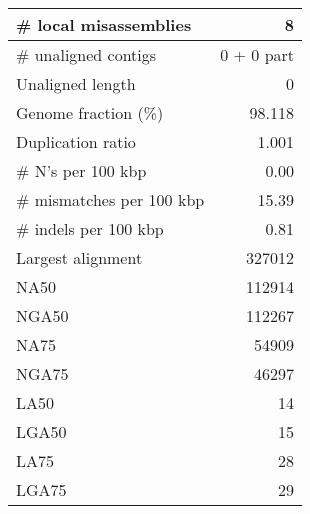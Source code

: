 \documentclass[12pt,a4paper]{article}
\begin{document}
\begin{table}[ht]
\begin{center}
\begin{tabular}{|l*{1}{|r}|}
\# local misassemblies & 8 \\ \hline
\# unaligned contigs & 0 + 0 part \\ \hline
Unaligned length & 0 \\ \hline
Genome fraction (\%) & 98.118 \\ \hline
Duplication ratio & 1.001 \\ \hline
\# N's per 100 kbp & 0.00 \\ \hline
\# mismatches per 100 kbp & 15.39 \\ \hline
\# indels per 100 kbp & 0.81 \\ \hline
Largest alignment & 327012 \\ \hline
NA50 & 112914 \\ \hline
NGA50 & 112267 \\ \hline
NA75 & 54909 \\ \hline
NGA75 & 46297 \\ \hline
LA50 & 14 \\ \hline
LGA50 & 15 \\ \hline
LA75 & 28 \\ \hline
LGA75 & 29 \\ \hline
\end{tabular}
\end{center}
\end{table}
\end{document}

